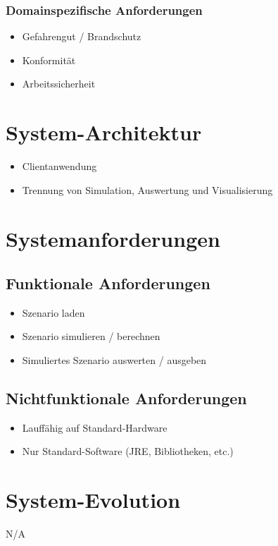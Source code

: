 \documentclass[11pt,a4paper]{article}
\begin{document}
%
\subsubsection{Domainspezifische Anforderungen}
\begin{itemize}
  \item Gefahrengut / Brandschutz
  \item Konformität
  \item Arbeitssicherheit
\end{itemize}
%
\section{System-Architektur}
\begin{itemize}
  \item Clientanwendung
  \item Trennung von Simulation, Auswertung und Visualisierung
\end{itemize}
%
\section{Systemanforderungen}
%
\subsection{Funktionale Anforderungen}
\begin{itemize}
  \item Szenario laden
  \item Szenario simulieren / berechnen
  \item Simuliertes Szenario auswerten / ausgeben
\end{itemize}
%
\subsection{Nichtfunktionale Anforderungen}
\begin{itemize}
  \item Lauffähig auf Standard-Hardware
  \item Nur Standard-Software (JRE, Bibliotheken, etc.)
\end{itemize}
%
\section{System-Evolution}
N/A
%
\end{document}
